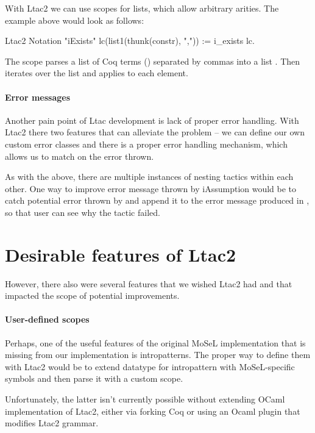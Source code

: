 With Ltac2 we can use scopes for lists, which allow arbitrary arities.
The example above would look as follows:

\begin{coq}
  Ltac2 Notation "iExists" lc(list1(thunk(constr), ",")) :=
  i_exists$\text{~}$lc.
\end{coq}

The scope parses a list of Coq terms () separated by commas into a list .
Then  iterates over the list and applies  to each element.

\paragraph{Error messages}

Another pain point of Ltac development is lack of proper error handling.
With Ltac2 there two features that can alleviate the problem -- we can define our own custom error classes and there is a proper error handling mechanism, which allows us to match on the error thrown.

As with the  above, there are multiple instances of nesting tactics within each other.
One way to improve error message thrown by iAssumption would be to catch potential error thrown by  and append it to the error message produced in , so that user can see why the tactic failed.

\section{Desirable features of Ltac2}
\label{sec:desir-feat-ltac2-chap4}

However, there also were several features that we wished Ltac2 had and that impacted the scope of potential improvements.

\paragraph{User-defined scopes}

Perhaps, one of the useful features of the original MoSeL implementation that is missing from our implementation is intropatterns.
The proper way to define them with Ltac2 would be to extend datatype for intropattern with MoSeL-specific symbols and then parse it with a custom scope.

Unfortunately, the latter isn't currently possible without extending OCaml implementation of Ltac2, either via forking Coq or using an Ocaml plugin that modifies Ltac2 grammar.

